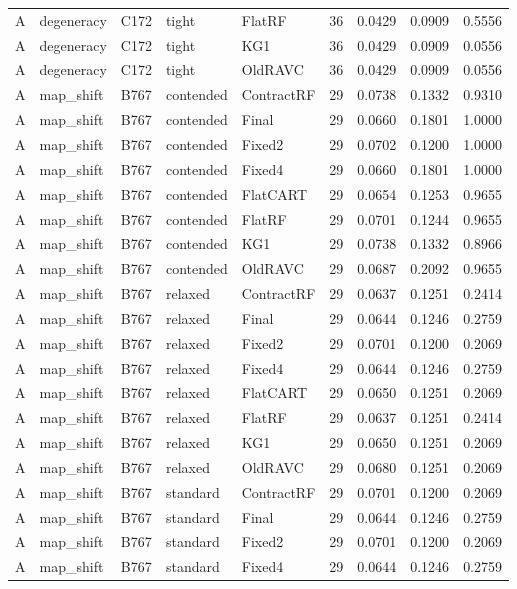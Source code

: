 \begin{longtable}{@{}lllllllll@{}}
A & degeneracy & C172 & tight & FlatRF & 36 & 0.0429 & 0.0909 & 0.5556\\
A & degeneracy & C172 & tight & KG1 & 36 & 0.0429 & 0.0909 & 0.0556\\
A & degeneracy & C172 & tight & OldRAVC & 36 & 0.0429 & 0.0909 & 0.0556\\
A & map\_shift & B767 & contended & ContractRF & 29 & 0.0738 & 0.1332 & 0.9310\\
A & map\_shift & B767 & contended & Final & 29 & 0.0660 & 0.1801 & 1.0000\\
A & map\_shift & B767 & contended & Fixed2 & 29 & 0.0702 & 0.1200 & 1.0000\\
A & map\_shift & B767 & contended & Fixed4 & 29 & 0.0660 & 0.1801 & 1.0000\\
A & map\_shift & B767 & contended & FlatCART & 29 & 0.0654 & 0.1253 & 0.9655\\
A & map\_shift & B767 & contended & FlatRF & 29 & 0.0701 & 0.1244 & 0.9655\\
A & map\_shift & B767 & contended & KG1 & 29 & 0.0738 & 0.1332 & 0.8966\\
A & map\_shift & B767 & contended & OldRAVC & 29 & 0.0687 & 0.2092 & 0.9655\\
A & map\_shift & B767 & relaxed & ContractRF & 29 & 0.0637 & 0.1251 & 0.2414\\
A & map\_shift & B767 & relaxed & Final & 29 & 0.0644 & 0.1246 & 0.2759\\
A & map\_shift & B767 & relaxed & Fixed2 & 29 & 0.0701 & 0.1200 & 0.2069\\
A & map\_shift & B767 & relaxed & Fixed4 & 29 & 0.0644 & 0.1246 & 0.2759\\
A & map\_shift & B767 & relaxed & FlatCART & 29 & 0.0650 & 0.1251 & 0.2069\\
A & map\_shift & B767 & relaxed & FlatRF & 29 & 0.0637 & 0.1251 & 0.2414\\
A & map\_shift & B767 & relaxed & KG1 & 29 & 0.0650 & 0.1251 & 0.2069\\
A & map\_shift & B767 & relaxed & OldRAVC & 29 & 0.0680 & 0.1251 & 0.2069\\
A & map\_shift & B767 & standard & ContractRF & 29 & 0.0701 & 0.1200 & 0.2069\\
A & map\_shift & B767 & standard & Final & 29 & 0.0644 & 0.1246 & 0.2759\\
A & map\_shift & B767 & standard & Fixed2 & 29 & 0.0701 & 0.1200 & 0.2069\\
A & map\_shift & B767 & standard & Fixed4 & 29 & 0.0644 & 0.1246 & 0.2759\\

\end{longtable}
